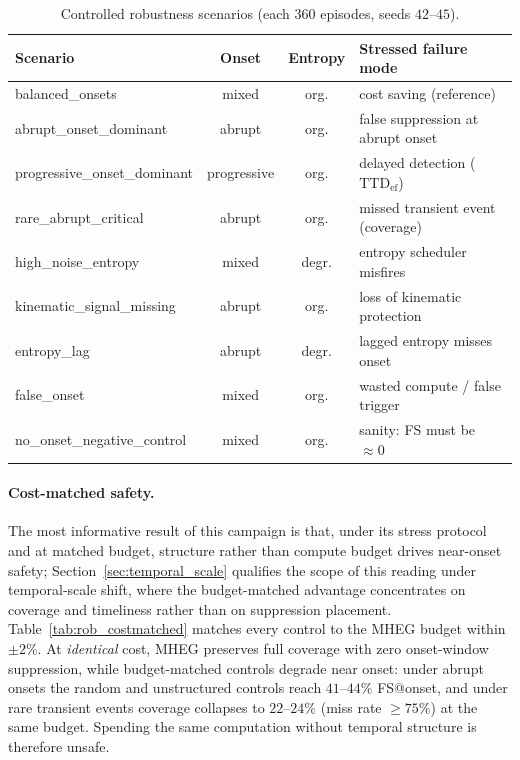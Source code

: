 \begin{table}[!tbp]
\centering
\caption{Controlled robustness scenarios (each $360$ episodes, seeds
$42$--$45$).}
\label{tab:rob_scenarios}
\scriptsize
\setlength{\tabcolsep}{4pt}
\renewcommand{\arraystretch}{1.15}
\begin{tabularx}{\columnwidth}{>{\raggedright\arraybackslash}l c c
  >{\raggedright\arraybackslash}X}
\toprule
\textbf{Scenario} & \textbf{Onset} & \textbf{Entropy} & \textbf{Stressed failure mode} \\
\midrule
balanced\_onsets            & mixed       & org.  & cost saving (reference) \\
\rowcolor{gray!8}
abrupt\_onset\_dominant      & abrupt      & org.  & false suppression at abrupt onset \\
progressive\_onset\_dominant & progressive & org.  & delayed detection ($\mathrm{TTD}_{\mathrm{ef}}$) \\
\rowcolor{gray!8}
rare\_abrupt\_critical       & abrupt      & org.  & missed transient event (coverage) \\
high\_noise\_entropy         & mixed       & degr. & entropy scheduler misfires \\
\rowcolor{gray!8}
kinematic\_signal\_missing   & abrupt      & org.  & loss of kinematic protection \\
entropy\_lag                & abrupt      & degr. & lagged entropy misses onset \\
\rowcolor{gray!8}
false\_onset                & mixed       & org.  & wasted compute / false trigger \\
no\_onset\_negative\_control & mixed       & org.  & sanity: FS must be $\approx 0$ \\
\bottomrule
\end{tabularx}
\end{table}

\paragraph{Cost-matched safety.}
The most informative result of this campaign is that, under its stress
protocol and at matched budget, structure rather than compute budget drives
near-onset safety; {\color{\revcolor}Section~\ref{sec:temporal_scale}
qualifies the scope of this reading under temporal-scale shift, where the
budget-matched advantage concentrates on coverage and timeliness rather than
on suppression placement.}
Table~\ref{tab:rob_costmatched} matches every control to the \mbox{MHEG}
budget within $\pm 2\%$. At \emph{identical} cost, \mbox{MHEG} preserves full
coverage with zero onset-window suppression, while budget-matched controls
degrade near onset: under abrupt onsets the random and unstructured controls
reach $41$--$44\%$ FS@onset, and under rare transient events coverage
collapses to $22$--$24\%$ (miss rate $\ge 75\%$) at the same budget. Spending
the same computation without temporal structure is therefore unsafe.

